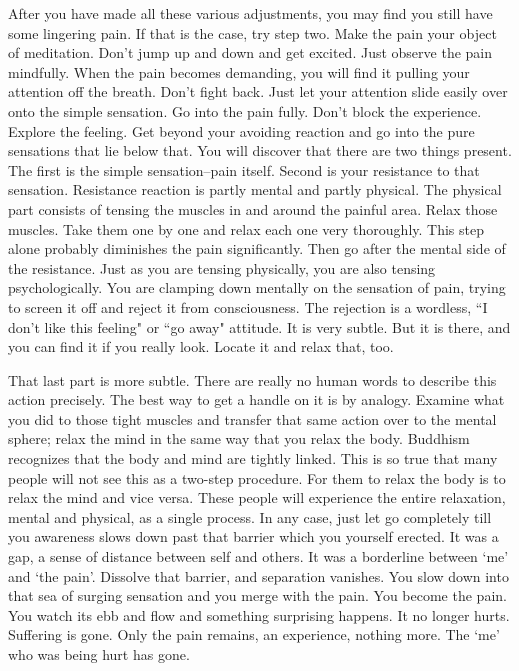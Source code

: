 After you have made all these various adjustments, you may find you still have
some lingering pain. If that is the case, try step two. Make the pain your
object of meditation. Don't jump up and down and get excited. Just observe the
pain mindfully. When the pain becomes demanding, you will find it pulling your
attention off the breath. Don't fight back. Just let your attention slide easily
over onto the simple sensation. Go into the pain fully. Don't block the
experience. Explore the feeling. Get beyond your avoiding reaction and go into
the pure sensations that lie below that. You will discover that there are two
things present. The first is the simple sensation--pain itself. Second is your
resistance to that sensation. Resistance reaction is partly mental and partly
physical. The physical part consists of tensing the muscles in and around the
painful area. Relax those muscles. Take them one by one and relax each one very
thoroughly. This step alone probably diminishes the pain significantly. Then go
after the mental side of the resistance. Just as you are tensing physically, you
are also tensing psychologically. You are clamping down mentally on the
sensation of pain, trying to screen it off and reject it from consciousness. The
rejection is a wordless, ``I don't like this feeling" or ``go away" attitude. It
is very subtle. But it is there, and you can find it if you really look. Locate
it and relax that, too.

That last part is more subtle. There are really no human words to describe this
action precisely. The best way to get a handle on it is by analogy. Examine what
you did to those tight muscles and transfer that same action over to the mental
sphere; relax the mind in the same way that you relax the body. Buddhism
recognizes that the body and mind are tightly linked. This is so true that many
people will not see this as a two-step procedure. For them to relax the body is
to relax the mind and vice versa. These people will experience the entire
relaxation, mental and physical, as a single process. In any case, just let go
completely till you awareness slows down past that barrier which you yourself
erected. It was a gap, a sense of distance between self and others. It was a
borderline between `me' and `the pain'. Dissolve that barrier, and separation
vanishes. You slow down into that sea of surging sensation and you merge with
the pain. You become the pain. You watch its ebb and flow and something
surprising happens. It no longer hurts. Suffering is gone. Only the pain
remains, an experience, nothing more. The `me' who was being hurt has gone.

